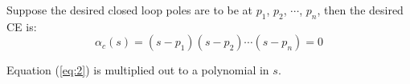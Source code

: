 Suppose the desired closed loop poles are to be at $p_1$, $p_2$, $\cdots$, $p_n$, then the desired CE is:
\begin{equation}
	\label{eq:2}
	\alpha_c(s) = (s-p_1)(s-p_2)\cdots(s-p_n)=0
\end{equation} 

Equation (\ref{eq:2}) is multiplied out to a polynomial in $s$.

\endinput

